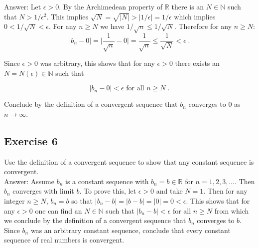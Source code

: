 \documentclass{article}
\begin{document}
Answer: Let $\epsilon > 0$. By the Archimedean property of $\mathbb{R}$ there is an $N \in \mathbb{N}$ such that $N > 1/\epsilon^2$. This implies $\sqrt{N} = \sqrt{|N|} > |1/\epsilon| = 1/\epsilon$ which implies $0<1/\sqrt{N}<\epsilon$. For any $n \geq N$ we have $1/\sqrt{n} \leq 1/\sqrt{N}$. Therefore for any $n \geq N$:
$$
|b_n - 0| = \biggr\lvert \frac{1}{\sqrt{n}} - 0 \biggr\rvert = \frac{1}{\sqrt{n}} \leq \frac{1}{\sqrt{N}} < \epsilon \;.
$$

Since $\epsilon > 0$ was arbitrary, this shows that for any $\epsilon > 0$ there exists an $N = N(\epsilon) \in \mathbb{N}$ such that

$$|b_n - 0| < \epsilon \text{ for all } n\geq N \;.$$

Conclude by the definition of a convergent sequence that $b_n$ converges to $0$ as $n \rightarrow \infty$. 

\subsection*{Exercise 6}
Use the definition of a convergent sequence to show that any constant sequence is convergent. \\

Answer: Assume $b_n$ is a constant sequence with $b_n = b \in \mathbb{R}$ for $n = 1,2,3,\dots$. Then $b_n$ converges with limit $b$. To prove this, let $\epsilon > 0$ and take $N=1$. Then for any integer $n\geq N$, $b_n = b$ so that $|b_n - b| = |b-b| = |0| = 0 < \epsilon$. This shows that for any $\epsilon > 0$ one can find an $N \in \mathbb{N}$ such that $|b_n - b| < \epsilon$ for all $n \geq N$ from which we conclude by the definition of a convergent sequence that $b_n$ converges to $b$. Since $b_n$ was an arbitrary constant sequence, conclude that every constant sequence of real numbers is convergent. 
\end{document}

